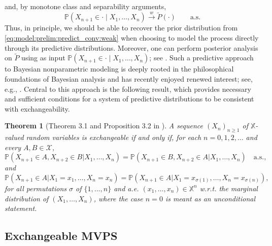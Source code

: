 \documentclass[a4paper]{article}
\theoremstyle{plain}
\newtheorem{theorem}{Theorem}
\theoremstyle{remark}
\theoremstyle{definition}
\begin{document}
and, by monotone class and separability arguments,
\begin{equation}\label{eq:model:prelim:predict_conv:weak}
\mathbb{P}(X_{n+1} \in \cdot \mid X_1, \ldots, X_{n})\overset{w}{\longrightarrow}\tilde{P}(\cdot)\qquad\text{a.s.}
\end{equation}
Thus, in principle, we should be able to recover the prior distribution from \eqref{eq:model:prelim:predict_conv:weak} when choosing to model the process directly through its predictive distributions. Moreover, one can perform posterior analysis on $\tilde{P}$ using as input $\mathbb{P}(X_{n+1}\in\cdot\mid X_1,\ldots,X_n)$; see \cite[][Section 2.4]{fortini2025}. Such a predictive approach to Bayesian nonparametric modeling is deeply rooted in the philosophical foundations of Bayesian analysis and has recently enjoyed renewed interest; see, e.g., \cite{berti2025,fong2023,fortini2025}. Central to this approach is the following result, which provides necessary and sufficient conditions for a system of predictive distributions to be consistent with exchangeability.

\begin{theorem}[Theorem 3.1 and Proposition 3.2 in \cite{fortini2000exchangeability}]\label{result:prelim:predictive_cond}
A sequence $(X_n)_{n\geq1}$ of $\mathbb{X}$-valued random variables is exchangeable if and only if, for each $n=0,1,2,\ldots$ and every $A,B\in\mathcal{X}$,
\begin{equation}\label{eq:model:prelim:predict:cond1}
\mathbb{P}(X_{n+1}\in A,X_{n+2}\in B|X_1,\ldots,X_n)=\mathbb{P}(X_{n+1}\in B,X_{n+2}\in A|X_1,\ldots,X_n)\quad\mbox{a.s.},
\end{equation}
and
\begin{equation}\label{eq:model:prelim:predict:cond2}
\mathbb{P}(X_{n+1}\in A|X_1=x_1,\ldots,X_n=x_n)=\mathbb{P}(X_{n+1}\in A|X_1=x_{\sigma(1)},\ldots,X_n=x_{\sigma(n)}),
\end{equation}
for all permutations $\sigma$ of $\{1,\ldots,n\}$ and a.e. $(x_1,\ldots,x_n)\in\mathbb{X}^n$ w.r.t. the marginal distribution of $(X_1,\ldots,X_n)$, where the case $n=0$ is meant as an unconditional statement.
\end{theorem}

\subsection{Exchangeable MVPS}\label{section:model:mvps}
\end{document}

